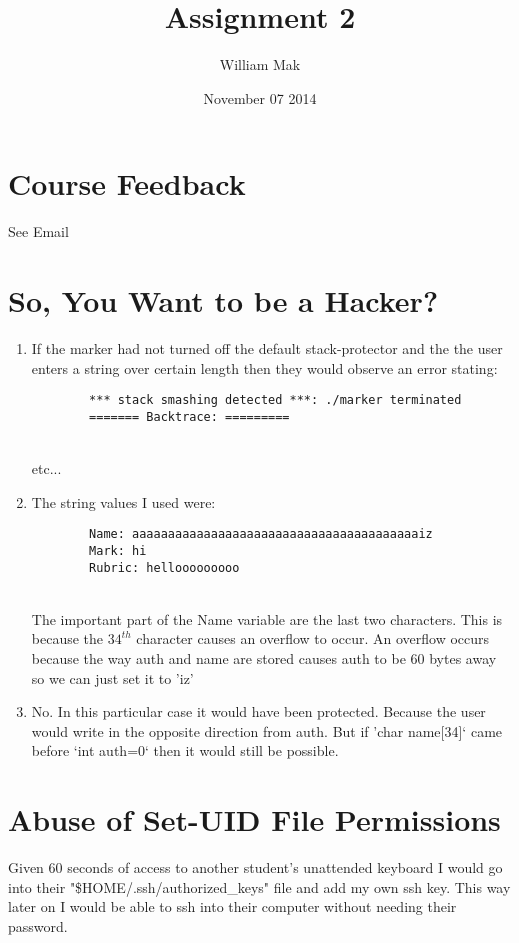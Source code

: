 \documentclass{article}
\title{Assignment 2}
\author{William Mak}
\date{November 07 2014}
\begin{document}
\maketitle

\section{Course Feedback}
See Email

\section{So, You Want to be a Hacker?}
\begin{enumerate}[A]
	\item
		If the marker had not turned off the default stack-protector and the the
		user enters a string over certain length then they would observe an
		error stating:
		\begin{verbatim}
		*** stack smashing detected ***: ./marker terminated
		======= Backtrace: =========
		\end{verbatim}\\
		etc...
	\item
		The string values I used were:
		\begin{verbatim}
		Name: aaaaaaaaaaaaaaaaaaaaaaaaaaaaaaaaaaaaaaaaiz
		Mark: hi
		Rubric: hellooooooooo
		\end{verbatim}\\
		The important part of the Name variable are the last two characters.
		This is because the $34^{th}$ character causes an overflow to occur. An
		overflow occurs because the way auth and name are stored causes auth to 
		be 60 bytes away so we can just set it to 'iz'
	\item
		No. In this particular case it would have been protected. Because the
		user would write in the opposite direction from auth. But if 
		'char name[34]` came before `int auth=0` then it would still be 
		possible.
\end{enumerate}

\section{Abuse of Set-UID File Permissions}
Given 60 seconds of access to another student's unattended keyboard I would go
into their "\$HOME/.ssh/authorized\_keys" file and add my own ssh key. This way
later on I would be able to ssh into their computer without needing their
password.
\end{document}
